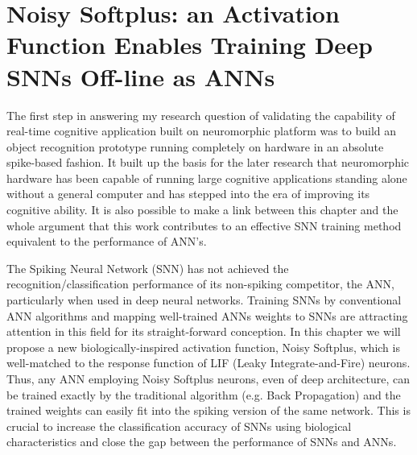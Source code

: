 \chapter{Noisy Softplus: an Activation Function Enables Training Deep SNNs Off-line as ANNs}
\label{cha:Conv}
The first step in answering my research question of validating the capability of real-time cognitive application built on neuromorphic platform was to build an object recognition prototype running completely on hardware in an absolute spike-based fashion.
It built up the basis for the later research that neuromorphic hardware has been capable of running large cognitive applications standing alone without a general computer and has stepped into the era of improving its cognitive ability.
It is also possible to make a link between this chapter and the whole argument that this work contributes to an effective SNN training method equivalent to the performance of ANN's.

The Spiking Neural Network (SNN) has not achieved the recognition/classification performance of its non-spiking competitor, the ANN, particularly when used in deep neural networks.
Training SNNs by conventional ANN algorithms and mapping well-trained ANNs weights to SNNs are attracting attention in this field for its straight-forward conception.
In this chapter we will propose a new biologically-inspired activation function, Noisy Softplus, which is well-matched to the response function of LIF (Leaky Integrate-and-Fire) neurons.
Thus, any ANN employing Noisy Softplus neurons, even of deep architecture, can be trained exactly by the traditional algorithm (e.g. Back Propagation) and the trained weights can easily fit into the spiking version of the same network.
This is crucial to increase the classification accuracy of SNNs using biological characteristics and close the gap between the performance of SNNs and ANNs.


